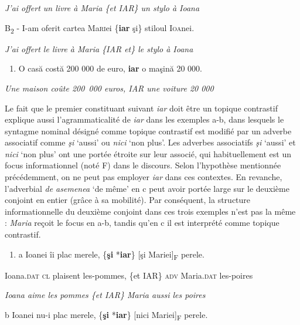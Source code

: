 {\itshape
J'ai offert un livre à Maria \{et {\textbar} IAR\} un stylo à Ioana} 

  B\textsubscript{2}  - I-am oferit cartea Ma\textsc{ri}ei \{\textbf{iar} {\textbar} şi\} stiloul I\textsc{oa}nei.

{\itshape
J'ai offert le livre à Maria \{IAR {\textbar} et\} le stylo à Ioana} 


\begin{enumerate}
\item \label{bkm:Ref301979294}O casă costă 200 000 de euro, \textbf{iar} o maşină 20 000. 


\end{enumerate}
{\itshape
Une maison coûte 200~000 euros, IAR une voiture 20 000}

Le fait que le premier constituant suivant \textit{iar} doit être un topique contrastif explique aussi l'agrammaticalité de \textit{iar} dans les exemples a-b, dans lesquels le syntagme nominal désigné comme topique contrastif est modifié par un adverbe associatif comme \textit{şi} `aussi' ou \textit{nici} `non plus'. Les adverbes associatifs \textit{şi} `aussi' et \textit{nici} `non plus' ont une portée étroite sur leur associé, qui habituellement est un focus informationnel (noté F) dans le discours. Selon l'hypothèse mentionnée précédemment, on ne peut pas employer \textit{iar} dans ces contextes. En revanche, l'adverbial \textit{de asemenea} `de même' en c peut avoir portée large sur le deuxième conjoint en entier (grâce à sa mobilité). Par conséquent, la structure informationnelle du deuxième conjoint dans ces trois exemples n'est pas la même : \textit{Maria} reçoit le focus en a-b, tandis qu'en c il est interprété comme topique contrastif. 


\begin{enumerate}
\item \label{bkm:Ref301981893}a  Ioanei  îi  plac  merele,  \{\textbf{şi} {\textbar} *\textbf{iar}\}  [şi  Mariei]\textsubscript{F}  perele.


\end{enumerate}
Ioana\textsc{.dat  cl}  plaisent  les-pommes,  \{et {\textbar} IAR\}  \textsc{adv}  Maria\textsc{.dat}  les-poires

{\itshape
Ioana aime les pommes \{et {\textbar} IAR\} Maria aussi les poires}

  b  Ioanei  nu-i  plac  merele,  \{\textbf{şi} {\textbar} *\textbf{iar}\}  [nici  Mariei]\textsubscript{F}  perele.


